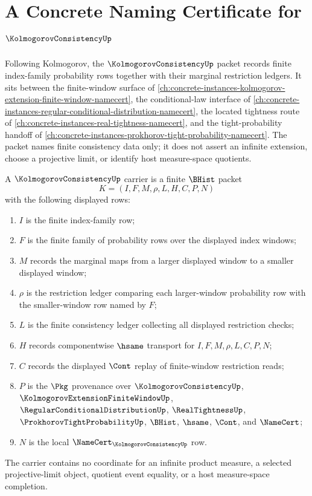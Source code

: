 \chapter{A Concrete Naming Certificate for $\KolmogorovConsistencyUp$}
\label{ch:concrete-instances-kolmogorov-consistency-namecert}

Following Kolmogorov, the $\KolmogorovConsistencyUp$ packet records finite
index-family probability rows together with their marginal restriction ledgers.
It sits between the finite-window surface of
\autoref{ch:concrete-instances-kolmogorov-extension-finite-window-namecert},
the conditional-law interface of
\autoref{ch:concrete-instances-regular-conditional-distribution-namecert}, the
located tightness route of \autoref{ch:concrete-instances-real-tightness-namecert},
and the tight-probability handoff of
\autoref{ch:concrete-instances-prokhorov-tight-probability-namecert}. The packet
names finite consistency data only; it does not assert an infinite extension,
choose a projective limit, or identify host measure-space quotients.

\begin{definition}
\label{def:kolmogorov-consistency-carrier}
A $\KolmogorovConsistencyUp$ carrier is a finite $\BHist$ packet
$$
K=(I,F,M,\rho,L,H,C,P,N)
$$
with the following displayed rows:
\begin{enumerate}
\item $I$ is the finite index-family row;
\item $F$ is the finite family of probability rows over the displayed index
windows;
\item $M$ records the marginal maps from a larger displayed window to a smaller
displayed window;
\item $\rho$ is the restriction ledger comparing each larger-window probability
row with the smaller-window row named by $F$;
\item $L$ is the finite consistency ledger collecting all displayed
restriction checks;
\item $H$ records componentwise $\hsame$ transport for $I,F,M,\rho,L,C,P,N$;
\item $C$ records the displayed $\Cont$ replay of finite-window restriction
reads;
\item $P$ is the $\Pkg$ provenance over $\KolmogorovConsistencyUp$,
$\KolmogorovExtensionFiniteWindowUp$, $\RegularConditionalDistributionUp$,
$\RealTightnessUp$, $\ProkhorovTightProbabilityUp$, $\BHist$, $\hsame$,
$\Cont$, and $\NameCert$;
\item $N$ is the local $\NameCert_{\KolmogorovConsistencyUp}$ row.
\end{enumerate}
The carrier contains no coordinate for an infinite product measure, a selected
projective-limit object, quotient event equality, or a host measure-space
completion.
\end{definition}


